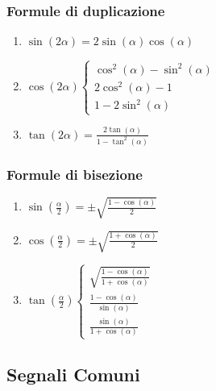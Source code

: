         \subsubsection{Formule di duplicazione}\label{Trigonometria_Duplicazione}
            \begin{enumerate}
                \item {
                    $\sin(2\alpha) =2\sin(\alpha)\cos(\alpha)$ 
                }
                \item {
                    $
                        \cos(2\alpha)
                        \begin{cases}
                            \cos^2(\alpha) - \sin^2(\alpha) \\
                            2\cos^2(\alpha)-1\\
                            1-2\sin^2(\alpha)
                        \end{cases}
                    $
                }
                \item {
                    $\tan(2\alpha) =\frac{2\tan(\alpha)}{1-\tan^2(\alpha)}$ 
                }
            \end{enumerate}
            \subsubsection{Formule di bisezione}\label{Trigonometria_Bisezione}
                \begin{enumerate}
                    \item {
                        $\sin(\frac{\alpha}{2}) =\pm\sqrt{\frac{1-\cos(\alpha)}{2}}$ 
                    }
                    \item {
                        $\cos(\frac{\alpha}{2}) =\pm\sqrt{\frac{1+\cos(\alpha)}{2}}$ 
                    }
                    \item {
                        $
                            \tan(\frac{\alpha}{2})
                            \begin{cases}
                                \sqrt{\frac{1-\cos(\alpha)}{1+\cos(\alpha)}} \\
                                \frac{1-\cos(\alpha)}{\sin(\alpha)}\\
                                \frac{\sin(\alpha)}{1+\cos(\alpha)}
                            \end{cases}
                        $
                    }
                \end{enumerate}
    \subsection{Segnali Comuni}\label{Segnali Comuni}
